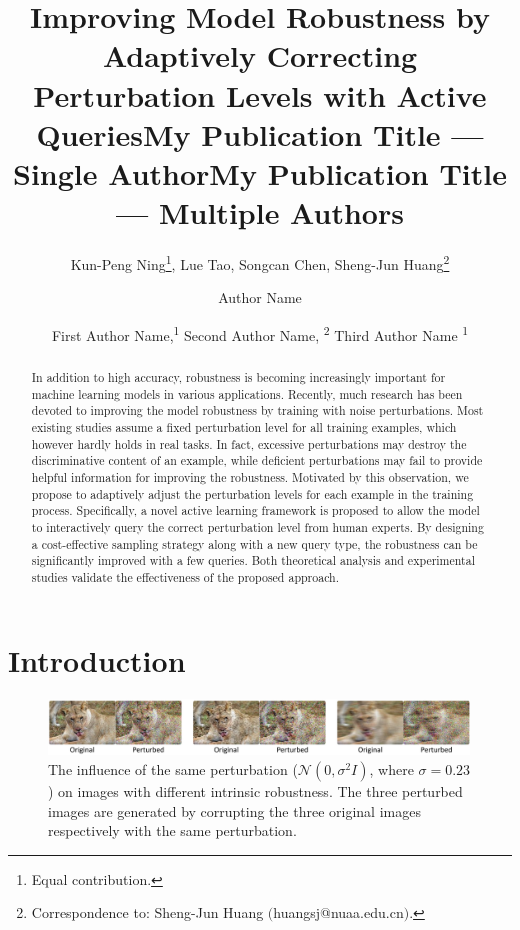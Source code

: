 \documentclass[letterpaper]{article} %
\title{Improving Model Robustness by Adaptively Correcting \\Perturbation Levels with Active Queries}
\author{
    Kun-Peng Ning\thanks{Equal contribution.},
    Lue Tao\footnotemark[1],
    Songcan Chen,
    Sheng-Jun Huang\thanks{Correspondence to: Sheng-Jun Huang $($huangsj@nuaa.edu.cn$)$.}\\
}
\title{My Publication Title --- Single Author}
\author {
    Author Name \\
}
\title{My Publication Title --- Multiple Authors}
\author {
    First Author Name,\textsuperscript{\rm 1}
    Second Author Name, \textsuperscript{\rm 2}
    Third Author Name \textsuperscript{\rm 1} \\
}
\begin{document}
\maketitle


\begin{abstract}
In addition to high accuracy, robustness is becoming increasingly important for machine learning models in various applications. Recently, much research has been devoted to improving the model robustness by training with noise perturbations. Most existing studies assume a fixed perturbation level for all training examples, which however hardly holds in real tasks. In fact, excessive perturbations may destroy the discriminative content of an example, while deficient perturbations may fail to provide helpful information for improving the robustness. Motivated by this observation, we propose to adaptively adjust the perturbation levels for each example in the training process. Specifically, a novel active learning framework is proposed to allow the model to interactively query the correct perturbation level from human experts. By designing a cost-effective sampling strategy along with a new query type, the robustness can be significantly improved with a few queries. Both theoretical analysis and experimental studies validate the effectiveness of the proposed approach.
\end{abstract}


\section{Introduction}

\begin{figure}[t]
	\begin{center}
		\includegraphics*[width=0.995\textwidth]{img/diffnoise3.pdf}
		\caption{The influence of the same perturbation ($\mathcal{N}(0, \sigma^2 I)$, where $\sigma=0.23$) on images with different intrinsic robustness. The three perturbed images are generated by corrupting the three original images respectively with the same perturbation.}
		\label{fig:example}
	\end{center}
\end{figure}
\end{document}
